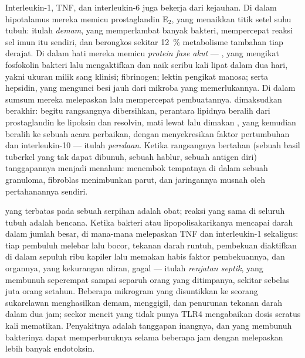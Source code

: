 \begin{proposition}\label{prop:b3:innate-immunity:systemic}
%
Interleukin-1, TNF, dan interleukin-6 juga bekerja dari kejauhan. Di dalam
hipotalamus mereka memicu prostaglandin E$_{2}$, yang menaikkan titik
setel suhu tubuh: itulah \emph{demam}, yang memperlambat banyak bakteri,
mempercepat reaksi sel imun itu sendiri, dan berongkos sekitar \qty{12}{\%}
metabolisme tambahan tiap derajat. Di dalam hati mereka memicu
\emph{protein fase akut} --- , yang mengikat
fosfokolin bakteri lalu mengaktifkan  dan naik seribu
kali lipat dalam dua hari, yakni ukuran  milik sang klinisi;
fibrinogen; lektin pengikat manosa; serta hepsidin, yang mengunci besi jauh
dari mikroba yang memerlukannya. Di dalam sumsum mereka melepaskan 
lalu mempercepat pembuatannya.  dimaksudkan berakhir: begitu
rangsangnya dibersihkan, perantara lipidnya beralih dari prostaglandin ke
lipoksin dan resolvin,  mati lewat  lalu dimakan
, yang kemudian beralih ke sebuah acara perbaikan, dengan menyekresikan
faktor pertumbuhan dan interleukin-10 --- itulah \emph{peredaan}. Ketika
rangsangnya bertahan (sebuah basil tuberkel yang tak dapat dibunuh, sebuah hablur,
sebuah antigen diri) tanggapannya menjadi menahun:  menembok tempatnya
di dalam sebuah granuloma, fibroblas menimbunkan parut, dan jaringannya musnah
oleh pertahanannya sendiri.
\end{proposition}

\begin{example}[Sepsis]\label{ex:b3:innate-immunity:sepsis}
 yang terbatas pada sebuah serpihan adalah obat; reaksi yang sama
di seluruh tubuh adalah bencana. Ketika bakteri atau
lipopolisakarikanya mencapai darah dalam jumlah besar,  di mana-mana
melepaskan TNF dan interleukin-1 sekaligus: tiap pembuluh melebar lalu bocor,
tekanan darah runtuh, pembekuan diaktifkan di dalam sepuluh ribu
kapiler lalu memakan habis faktor pembekuannya, dan organnya, yang kekurangan
aliran, gagal --- itulah \emph{renjatan septik}, yang membunuh seperempat sampai
separuh orang yang ditimpanya, sekitar sebelas juta orang setahun. Beberapa
mikrogram  yang disuntikkan ke seorang sukarelawan menghasilkan
demam, menggigil, dan penurunan tekanan darah dalam dua jam; seekor mencit
yang tidak punya TLR4 mengabaikan dosis seratus kali mematikan. Penyakitnya
adalah tanggapan inangnya, dan  yang membunuh bakterinya dapat
memperburuknya selama beberapa jam dengan melepaskan lebih banyak endotoksin.
\end{example}

